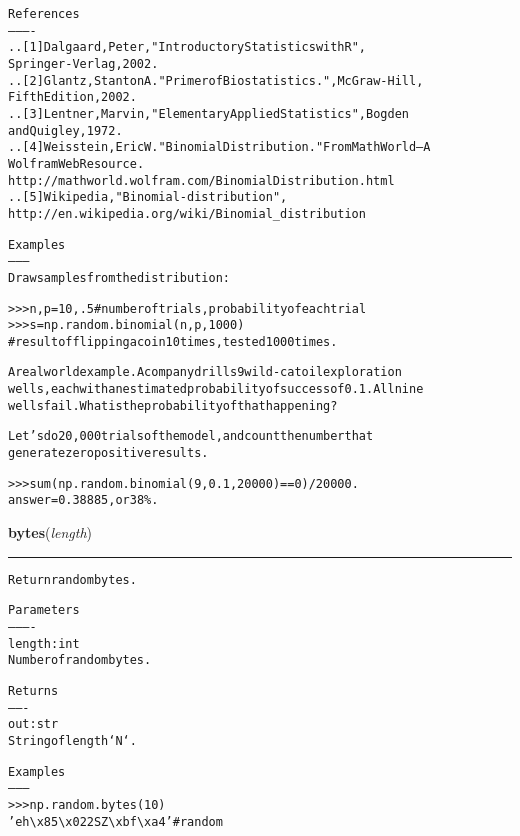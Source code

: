 \begin{boxedminipage}{\funcwidth}
\begin{alltt}
References
----------
.. [1] Dalgaard, Peter, "Introductory Statistics with R",
       Springer-Verlag, 2002.
.. [2] Glantz, Stanton A. "Primer of Biostatistics.", McGraw-Hill,
       Fifth Edition, 2002.
.. [3] Lentner, Marvin, "Elementary Applied Statistics", Bogden
       and Quigley, 1972.
.. [4] Weisstein, Eric W. "Binomial Distribution." From MathWorld--A
       Wolfram Web Resource.
       http://mathworld.wolfram.com/BinomialDistribution.html
.. [5] Wikipedia, "Binomial-distribution",
       http://en.wikipedia.org/wiki/Binomial\_distribution

Examples
--------
Draw samples from the distribution:

{\textgreater}{\textgreater}{\textgreater} n, p = 10, .5 \# number of trials, probability of each trial
{\textgreater}{\textgreater}{\textgreater} s = np.random.binomial(n, p, 1000)
\# result of flipping a coin 10 times, tested 1000 times.

A real world example. A company drills 9 wild-cat oil exploration
wells, each with an estimated probability of success of 0.1. All nine
wells fail. What is the probability of that happening?

Let's do 20,000 trials of the model, and count the number that
generate zero positive results.

{\textgreater}{\textgreater}{\textgreater} sum(np.random.binomial(9,0.1,20000)==0)/20000.
answer = 0.38885, or 38\%.
\end{alltt}

\setlength{\parskip}{1ex}
    \end{boxedminipage}

    \label{trunk:qstkutil:bollinger:bytes}

    \vspace{0.5ex}

\hspace{.8\funcindent}\begin{boxedminipage}{\funcwidth}

    \raggedright \textbf{bytes}(\textit{length})

    \vspace{-1.5ex}

    \rule{\textwidth}{0.5\fboxrule}
\setlength{\parskip}{2ex}
\begin{alltt}
Return random bytes.

Parameters
----------
length : int
    Number of random bytes.

Returns
-------
out : str
    String of length `N`.

Examples
--------
{\textgreater}{\textgreater}{\textgreater} np.random.bytes(10)
' eh{\textbackslash}x85{\textbackslash}x022SZ{\textbackslash}xbf{\textbackslash}xa4' \#random
\end{alltt}

\setlength{\parskip}{1ex}
    \end{boxedminipage}


